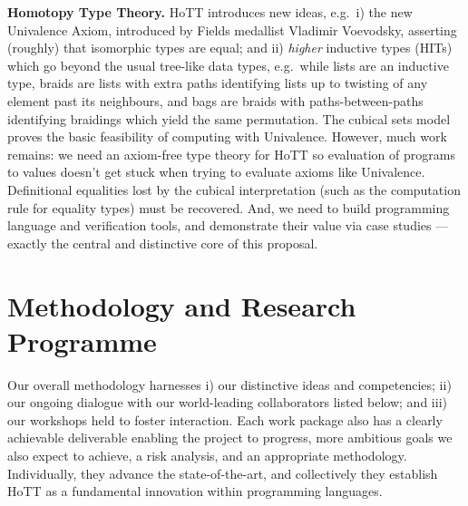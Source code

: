 \documentclass[a4paper,11pt]{article}
\newcommand{\eg}{{e.g.}\ }
\begin{document}
{\bf Homotopy Type Theory.} HoTT introduces new ideas, \eg i) the new
Univalence Axiom, introduced by Fields medallist Vladimir Voevodsky,
asserting (roughly) that isomorphic types are equal; and ii)
\emph{higher} inductive types (HITs) which go beyond the usual
tree-like data types, \eg while lists are an inductive type, braids
are lists with extra paths identifying lists up to twisting of any
element past its neighbours, and bags are braids with
paths-between-paths identifying braidings which yield the same
permutation.  The cubical sets model~\cite{BezemM:cubsmt, nominal} 
proves the basic feasibility of computing with Univalence.  However,
much work remains: we need an axiom-free type theory for HoTT 
so evaluation of programs to values doesn't get stuck when trying to evaluate
axioms like Univalence.
Definitional equalities lost by the cubical
interpretation (such as the computation rule for equality types) must
be recovered. And, we need to build programming language and
verification tools, and demonstrate their value via case studies ---
exactly the central and distinctive core of this proposal.

\vspace*{-0.2in}

\section{Methodology and Research Programme}
\vspace*{-0.1in}
Our overall methodology harnesses i) our distinctive ideas and
competencies; ii) our ongoing dialogue with our world-leading
collaborators listed below; and iii) our workshops held to foster
interaction. Each work package also has a clearly achievable
deliverable enabling the project to progress, more ambitious goals we
also expect to achieve, a risk analysis, and an appropriate methodology. Individually, they advance the state-of-the-art, and
collectively they establish HoTT as a fundamental innovation within
programming languages.
\end{document}
